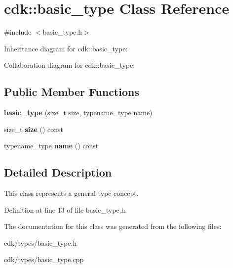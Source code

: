 \section{cdk\+:\+:basic\+\_\+type Class Reference}
\label{classcdk_1_1basic__type}


{\ttfamily \#include $<$basic\+\_\+type.\+h$>$}



Inheritance diagram for cdk\+:\+:basic\+\_\+type\+:


Collaboration diagram for cdk\+:\+:basic\+\_\+type\+:
\subsection*{Public Member Functions}
\begin{DoxyCompactItemize}
\item 
\mbox{\label{classcdk_1_1basic__type_ad1b36bf74d68fd9550b4da8a6c61e06b}} 
{\bfseries basic\+\_\+type} (size\+\_\+t size, typename\+\_\+type name)
\item 
\mbox{\label{classcdk_1_1basic__type_ac0daea790244c1aef28443eaf02aef81}} 
size\+\_\+t {\bfseries size} () const
\item 
\mbox{\label{classcdk_1_1basic__type_abf3074f6fac2ec308cb2a2f7a70d797c}} 
typename\+\_\+type {\bfseries name} () const
\end{DoxyCompactItemize}


\subsection{Detailed Description}
This class represents a general type concept. 

Definition at line 13 of file basic\+\_\+type.\+h.



The documentation for this class was generated from the following files\+:\begin{DoxyCompactItemize}
\item 
cdk/types/basic\+\_\+type.\+h\item 
cdk/types/basic\+\_\+type.\+cpp\end{DoxyCompactItemize}
